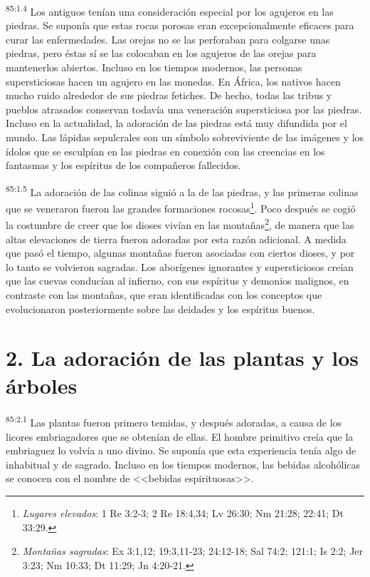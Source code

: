 \par
\textsuperscript{85:1.4} Los antiguos tenían una consideración especial por los agujeros en las piedras. Se suponía que estas rocas porosas eran excepcionalmente eficaces para curar las enfermedades. Las orejas no se las perforaban para colgarse unas piedras, pero éstas sí se las colocaban en los agujeros de las orejas para mantenerlos abiertos. Incluso en los tiempos modernos, las personas supersticiosas hacen un agujero en las monedas. En África, los nativos hacen mucho ruido alrededor de sus piedras fetiches. De hecho, todas las tribus y pueblos atrasados conservan todavía una veneración supersticiosa por las piedras. Incluso en la actualidad, la adoración de las piedras está muy difundida por el mundo. Las lápidas sepulcrales son un símbolo sobreviviente de las imágenes y los ídolos que se esculpían en las piedras en conexión con las creencias en los fantasmas y los espíritus de los compañeros fallecidos.

\par
\textsuperscript{85:1.5} La adoración de las colinas siguió a la de las piedras, y las primeras colinas que se veneraron fueron las grandes formaciones rocosas\footnote{\textit{Lugares elevados}: 1 Re 3:2-3; 2 Re 18:4,34; Lv 26:30; Nm 21:28; 22:41; Dt 33:29.}. Poco después se cogió la costumbre de creer que los dioses vivían en las montañas\footnote{\textit{Montañas sagradas}: Ex 3:1,12; 19:3,11-23; 24:12-18; Sal 74:2; 121:1; Is 2:2; Jer 3:23; Nm 10:33; Dt 11:29; Jn 4:20-21.}, de manera que las altas elevaciones de tierra fueron adoradas por esta razón adicional. A medida que pasó el tiempo, algunas montañas fueron asociadas con ciertos dioses, y por lo tanto se volvieron sagradas. Los aborígenes ignorantes y supersticiosos creían que las cuevas conducían al infierno, con sus espíritus y demonios malignos, en contraste con las montañas, que eran identificadas con los conceptos que evolucionaron posteriormente sobre las deidades y los espíritus buenos.

\section*{2. La adoración de las plantas y los árboles}
\par
\textsuperscript{85:2.1} Las plantas fueron primero temidas, y después adoradas, a causa de los licores embriagadores que se obtenían de ellas. El hombre primitivo creía que la embriaguez lo volvía a uno divino. Se suponía que esta experiencia tenía algo de inhabitual y de sagrado. Incluso en los tiempos modernos, las bebidas alcohólicas se conocen con el nombre de <<bebidas espirituosas>>.

